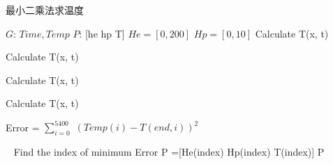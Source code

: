 \documentclass[11pt, twoside, a4paper]{article} %
\begin{document}
  
	\renewcommand{\algorithmicrequire}{\textbf{Input:}}
	\renewcommand{\algorithmicensure}{\textbf{Output:}}
	\begin{algorithm}[h]
		\renewcommand{\thealgorithm}{1}
		\caption{最小二乘法求温度}
		\begin{algorithmic}[1]
			\Require
			$G$: $Time, Temp$
			\textcolor{blue}{}
			\Ensure
			$P$: [he hp T] 
			\textcolor{blue}{}
			\State $He = [0, 200]$
			\State $Hp = [0, 10]$
							\State Calculate T(x, t)
							\textcolor{blue}{}
						\EndFor
						
							\State Calculate T(x, t)
						\EndFor
						
							\State Calculate T(x, t)
						\EndFor
						
							\State Calculate T(x, t)
						\EndFor
				
				\State Error = $\sum_{i=0}^{5400}$ $(Temp(i) - T(end, i))^2  $\textcolor{blue}{}
				
				
				
			
			\EndFor
			\EndFor\
			\EndFor
			\State Find the index of minimum Error
			\textcolor{blue}{}
			\State  P =[He(index) Hp(index) T(index)]
			\textcolor{blue}{}
			\State \Return P
			
			\EndFunction
		\end{algorithmic}
	\end{algorithm}
\end{document}
